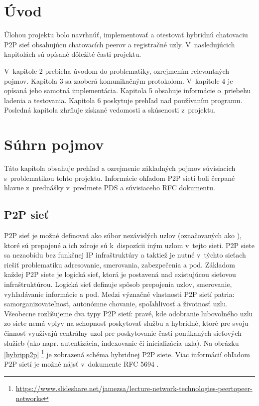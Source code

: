 \chapter{Úvod}
Úlohou projektu bolo navrhnúť, implementovať a otestovať hybridnú chatovaciu P2P sieť obsahujúcu chatovacích peerov a registračné uzly. V~nasledujúcich kapitolách sú opísané dôležité časti projektu.

V~kapitole 2 prebieha úvodom do problematiky, ozrejmením relevantných pojmov. Kapitola 3 sa zaoberá komunikačným protokolom. V~kapitole 4 je opísaná jeho samotná implementácia. Kapitola 5 obsahuje informácie o~priebehu ladenia a testovania. Kapitola 6 poskytuje prehľad nad používaním programu. Posledná kapitola zhrňuje získané vedomosti a skúsenosti z~projektu.
 

\chapter{Súhrn pojmov}
Táto kapitola obsahuje prehľad a ozrejmenie základných pojmov súvisiacich s~problematikou tohto projektu. Informácie ohľadom P2P sietí boli čerpané hlavne z~prednášky v~predmete PDS \cite{p2p_fit} a súvisiaceho RFC dokumentu.

\section*{P2P sieť}

P2P sieť je možné definovať ako súbor nezávislých uzlov (označovaných ako ), ktoré sú prepojené a ich zdroje sú k~dispozícii iným uzlom v~tejto sieti. P2P siete sa nezaobídu bez funkčnej IP infraštruktúry a taktiež je nutné v~týchto sieťach riešiť problematiku adresovanie, smerovania, zabezpečenia a pod.
Základom každej P2P siete je logická sieť, ktorá je postavená nad existujúcou sieťovou infraštruktúrou. Logická sieť definuje spôsob prepojenia uzlov, smerovanie, vyhľadávanie informácie a pod. Medzi význačné vlastnosti P2P sietí patria: samorganizovateľnosť, autonómne chovanie, spoľahlivosť a životnosť uzlu. 
Všeobecne rozlišujeme dva typy P2P sietí: pravé, kde odobranie ľubovolného uzlu zo siete nemá vplyv na schopnosť poskytovať službu a hybridné, ktoré pre svoju činnosť využívajú centrálny uzol pre poskytovanie časti ponúkaných sieťových služieb (ako napr. autentizácia, indexovanie či inicializácia uzla). Na obrázku \ref{hybripp2p} \footnote{\url{https://www.slideshare.net/jamezsa/lecture-network-technologies-peertopeer-networks}} je zobrazená schéma hybridnej P2P siete. Viac informácií ohľadom P2P sietí je možné nájsť v~dokumente RFC 5694 \cite{rfc5694}.

